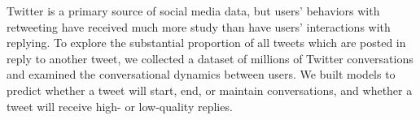 Twitter is a primary source of social media data, but users' behaviors with retweeting have received much more study than have users' interactions with replying. To explore the substantial proportion of all tweets which are posted in reply to another tweet, we collected a dataset of millions of Twitter conversations and examined the conversational dynamics between users. We built models to predict whether a tweet will start, end, or maintain conversations, and whether a tweet will receive high- or low-quality replies.

